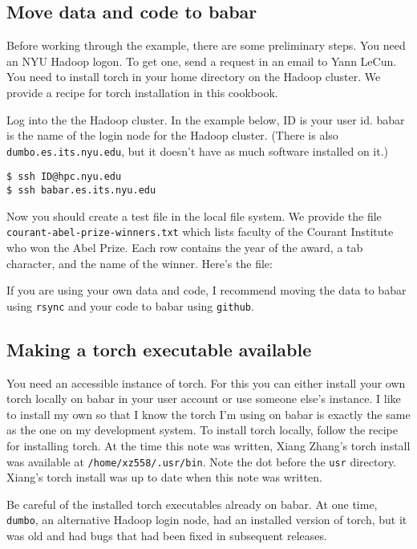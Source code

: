 \documentclass{article}
\let\code\texttt %
\begin{document}
\subsection{Move data and code to babar}

Before working through the example, there are some preliminary steps.
You need an NYU Hadoop logon. To get one, send a request in an email to
Yann LeCun. You need to install torch in your home directory 
on the Hadoop cluster. We provide a recipe for torch
installation in this cookbook.

Log into the the Hadoop cluster. In the example below, ID is your user
id. babar is the name of the login node for the Hadoop cluster.
(There is also \code{dumbo.es.its.nyu.edu}, but it doesn't have as much
software installed on it.)

\begin{verbatim}
$ ssh ID@hpc.nyu.edu
$ ssh babar.es.its.nyu.edu
\end{verbatim}


Now you should create a test file in the local file system. We provide
the file \code{courant-abel-prize-winners.txt} which lists faculty of the
Courant Institute who won the Abel Prize. Each row contains the year of
the award, a tab character, and the name of the winner. Here's the file:



If you are using your own data and code, I recommend moving the data to
babar using \code{rsync} and your code to babar using \code{github}.

\subsection{Making a torch executable available}

You need an accessible instance of torch. For this you can either
install your own torch locally on babar in your user account or use
someone else's instance. I like to install my own so that I know the
torch I'm using on babar is exactly the same as the one on my
development system. To install torch locally, follow the recipe for
installing torch. At the time this note was written, Xiang
Zhang's torch install was available at \code{/home/xz558/.usr/bin}. Note
the dot before the \code{usr} directory. Xiang's torch install was up to
date when this note was written.

Be careful of the installed torch executables already on babar. At one time,
\code{dumbo}, an alternative Hadoop login node, had an installed version
of torch, but it was old and had bugs that had been fixed in subsequent
releases.
\end{document}
